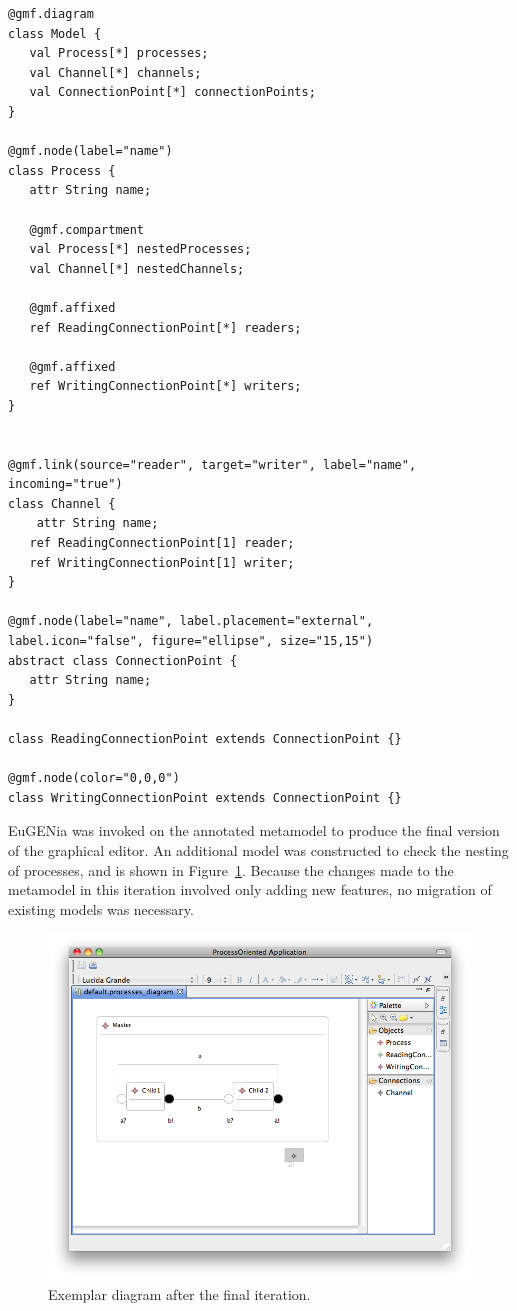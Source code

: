 \begin{lstlisting}[caption=The annotated process-oriented metamodel after six iterations, label=lst:po_it6_mm, language=Emfatic]
@gmf.diagram
class Model {
   val Process[*] processes;
   val Channel[*] channels;
   val ConnectionPoint[*] connectionPoints;
}

@gmf.node(label="name")
class Process {
   attr String name;

   @gmf.compartment
   val Process[*] nestedProcesses;
   val Channel[*] nestedChannels;
      
   @gmf.affixed
   ref ReadingConnectionPoint[*] readers;
   
   @gmf.affixed
   ref WritingConnectionPoint[*] writers; 
}


@gmf.link(source="reader", target="writer", label="name", incoming="true")
class Channel { 
	attr String name;
   ref ReadingConnectionPoint[1] reader;
   ref WritingConnectionPoint[1] writer;
}

@gmf.node(label="name", label.placement="external", label.icon="false", figure="ellipse", size="15,15")
abstract class ConnectionPoint {
   attr String name;
}

class ReadingConnectionPoint extends ConnectionPoint {}

@gmf.node(color="0,0,0")
class WritingConnectionPoint extends ConnectionPoint {}
\end{lstlisting}

EuGENia was invoked on the annotated metamodel to produce the final version of the graphical editor. An additional model was constructed to check the nesting of processes, and is shown in Figure~\ref{fig:po_it6_model}. Because the changes made to the metamodel in this iteration involved only adding new features, no migration of existing models was necessary.

\begin{figure}[htbp]
	\centering
		\includegraphics[scale=0.5]{A.2.ProcessOriented/images/6_model.png}
	\caption{Exemplar diagram after the final iteration.}
	\label{fig:po_it6_model}
\end{figure}

